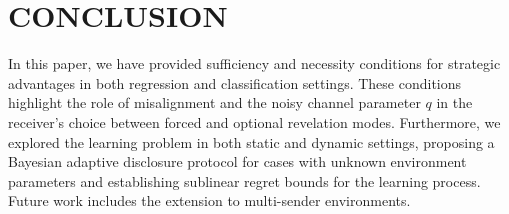 \section{CONCLUSION}
\label{sec:conclusion}
In this paper, we have provided sufficiency and necessity conditions for strategic advantages in both regression and classification settings. These conditions highlight the role of misalignment and the noisy channel parameter $q$ in the receiver's choice between forced and optional revelation modes. Furthermore, we explored the learning problem in both static and dynamic settings, proposing a Bayesian adaptive disclosure protocol for cases with unknown environment parameters and establishing sublinear regret bounds for the learning process. Future work includes the extension to multi-sender environments.
